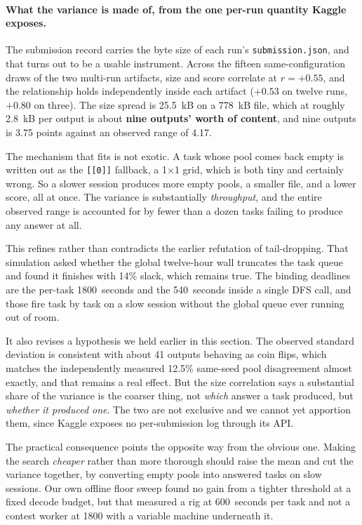 \documentclass[11pt]{article}
\begin{document}
\paragraph{What the variance is made of, from the one per-run quantity Kaggle exposes.}
The submission record carries the byte size of each run's \texttt{submission.json}, and that turns
out to be a usable instrument. Across the fifteen same-configuration draws of the two multi-run
artifacts, size and score correlate at $r = +0.55$, and the relationship holds independently inside each
artifact ($+0.53$ on twelve runs, $+0.80$ on three). The size spread is 25.5~kB on a 778~kB file, which at roughly 2.8~kB per output is
about \textbf{nine outputs' worth of content}, and nine outputs is 3.75 points against an observed
range of 4.17.

The mechanism that fits is not exotic. A task whose pool comes back empty is written out as the
\texttt{[[0]]} fallback, a 1$\times$1 grid, which is both tiny and certainly wrong. So a slower
session produces more empty pools, a smaller file, and a lower score, all at once. The variance is
substantially \emph{throughput}, and the entire observed range is accounted for by fewer than a dozen
tasks failing to produce any answer at all.

This refines rather than contradicts the earlier refutation of tail-dropping. That simulation asked
whether the global twelve-hour wall truncates the task queue and found it finishes with 14\% slack,
which remains true. The binding deadlines are the per-task 1800~seconds and the 540~seconds inside a
single DFS call, and those fire task by task on a slow session without the global queue ever running
out of room.

It also revises a hypothesis we held earlier in this section. The observed standard deviation is
consistent with about 41 outputs behaving as coin flips, which matches the independently measured
12.5\% same-seed pool disagreement almost exactly, and that remains a real effect. But the size
correlation says a substantial share of the variance is the coarser thing, not \emph{which} answer a
task produced, but \emph{whether it produced one}. The two are not exclusive and we cannot yet
apportion them, since Kaggle exposes no per-submission log through its API.

The practical consequence points the opposite way from the obvious one. Making the search
\emph{cheaper} rather than more thorough should raise the mean and cut the variance together, by
converting empty pools into answered tasks on slow sessions. Our own offline floor sweep found no
gain from a tighter threshold at a fixed decode budget, but that measured a rig at 600~seconds per
task and not a contest worker at 1800 with a variable machine underneath it.
\end{document}
